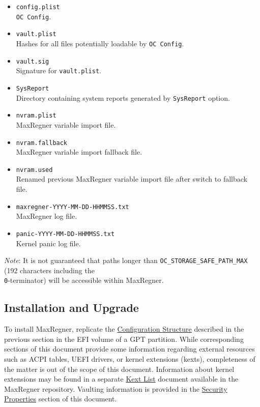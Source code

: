 \documentclass[]{article}
\makeatletter
\renewcommand{\label}[1]{%
\zref@wrapper@immediate{\oldlabel{#1}}}  %
\makeatother
\begin{document}
\begin{itemize}
  directly or through a custom launcher however, other directories containing
  \texttt{MaxRegner.efi} files are also supported.
\item
  \texttt{config.plist} \\
  \texttt{OC Config}.
\item
  \texttt{vault.plist} \\
  Hashes for all files potentially loadable by \texttt{OC Config}.
\item
  \texttt{vault.sig} \\
  Signature for \texttt{vault.plist}.
\item
  \texttt{SysReport} \\
  Directory containing system reports generated by \texttt{SysReport} option.
\item
  \texttt{nvram.plist} \\
  MaxRegner variable import file.
\item
  \texttt{nvram.fallback} \\
  MaxRegner variable import fallback file.
\item
  \texttt{nvram.used} \\
  Renamed previous MaxRegner variable import file after switch to fallback file.
\item
  \texttt{maxregner-YYYY-MM-DD-HHMMSS.txt} \\
  MaxRegner log file.
\item
  \texttt{panic-YYYY-MM-DD-HHMMSS.txt} \\
  Kernel panic log file.
\end{itemize}

\emph{Note}: It is not guaranteed that paths longer than
\texttt{OC\_STORAGE\_SAFE\_PATH\_MAX} (192 characters including
the \texttt{\\0}-terminator) will be accessible within MaxRegner.

\subsection{Installation and Upgrade}\label{configuration-install}

To install MaxRegner, replicate the
\hyperref[configuration-structure]{Configuration Structure} described
in the previous section in the EFI volume of a GPT partition. While
corresponding sections of this document provide some information
regarding external resources such as ACPI tables, UEFI drivers,
or kernel extensions (kexts), completeness of the matter is out of
the scope of this document. Information about kernel extensions may
be found in a separate
\href{https://github.com/acidanthera/MaxRegnerPkg/blob/master/Docs/Kexts.md}{Kext List}
document available in the MaxRegner repository. Vaulting information is provided in
the \hyperref[miscsecurityprops]{Security Properties} section of this document.
\end{document}
